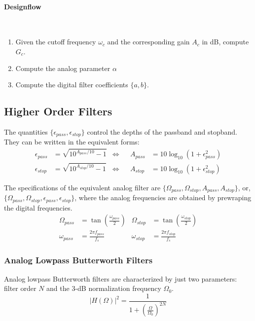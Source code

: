 \paragraph{Designflow} ~\\
\begin{enumerate}
	\item Given the cutoff frequency $\omega_c$ and the corresponding gain $A_c$ in dB, compute $G_c$.
	\item Compute the analog parameter $\alpha$
	\item Compute the digital filter coefficients $\{a,b\}$.
\end{enumerate}


\subsection{Higher Order Filters}
The quantities $\{\epsilon_{pass}, \epsilon_{stop}\}$ control the depths of the passband and stopband.
They can be written in the equivalent forms:
\begin{align*}
	\epsilon_{pass} &= \sqrt{10^{A_{pass}/10} - 1} & \Longleftrightarrow &&
	A_{pass}&= 10\log_{10}(1 + \epsilon_{pass}^2) \\
	\epsilon_{stop} &= \sqrt{10^{A_{stop}/10} - 1} & \Longleftrightarrow &&
	A_{stop}&= 10\log_{10}(1 + \epsilon_{stop}^2)
\end{align*}

The specifications of the equivalent analog filter are $\{\Omega_{pass}, \Omega_{stop}, A_{pass}, A_{stop} \}$, or, $\{\Omega_{pass}, \Omega_{stop}, \epsilon_{pass}, \epsilon_{stop} \}$, where the analog frequencies are obtained by prewraping the digital frequencies.
\begin{align*}
	\Omega_{pass} &= \tan\left(\frac{\omega_{pass}}{2}\right) & 
	\Omega_{stop} &= \tan\left(\frac{\omega_{stop}}{2}\right) \\
	\omega_{pass} &= \frac{2\pi f_{pass}}{f_s} &
	\omega_{stop} &= \frac{2\pi f_{stop}}{f_s} 
\end{align*}

\subsubsection{Analog Lowpass Butterworth Filters}
Analog lowpass Butterworth filters are characterized by just two parameters:
filter order $N$ and the 3-dB normalization frequency $\Omega_0$.
\[
	\left|H(\Omega)\right|^2 =
		\frac{1}{1 + \left(\frac{\Omega}{\Omega_0}\right)^{2N}}
\]

